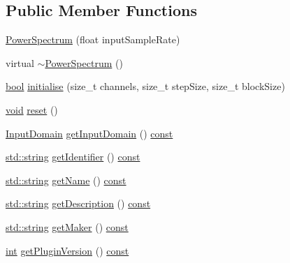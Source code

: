\subsection*{Public Member Functions}
\begin{DoxyCompactItemize}
\item 
\hyperlink{class_power_spectrum_aa2550486513a4abcf7b52869002947e7}{Power\+Spectrum} (float input\+Sample\+Rate)
\item 
virtual \hyperlink{class_power_spectrum_ae7081e159ad1da5da1721b3048075306}{$\sim$\+Power\+Spectrum} ()
\item 
\hyperlink{mac_2config_2i386_2lib-src_2libsoxr_2soxr-config_8h_abb452686968e48b67397da5f97445f5b}{bool} \hyperlink{class_power_spectrum_ae2d046334c4bede5be72a0d97e4dfb29}{initialise} (size\+\_\+t channels, size\+\_\+t step\+Size, size\+\_\+t block\+Size)
\item 
\hyperlink{sound_8c_ae35f5844602719cf66324f4de2a658b3}{void} \hyperlink{class_power_spectrum_a091ba21e1697ea4208f42e8295c389d9}{reset} ()
\item 
\hyperlink{class_vamp_1_1_plugin_a39cb7649d6dcc20e4cb1640cd55907bc}{Input\+Domain} \hyperlink{class_power_spectrum_ae04e0e34847a93f3444d04c802ee56ef}{get\+Input\+Domain} () \hyperlink{getopt1_8c_a2c212835823e3c54a8ab6d95c652660e}{const} 
\item 
\hyperlink{test__lib_f_l_a_c_2format_8c_ab02026ad0de9fb6c1b4233deb0a00c75}{std\+::string} \hyperlink{class_power_spectrum_a9e9d8349461cbb88d7565a5e8c51b64e}{get\+Identifier} () \hyperlink{getopt1_8c_a2c212835823e3c54a8ab6d95c652660e}{const} 
\item 
\hyperlink{test__lib_f_l_a_c_2format_8c_ab02026ad0de9fb6c1b4233deb0a00c75}{std\+::string} \hyperlink{class_power_spectrum_ac9214f9cafeeed3fca549c90aef57623}{get\+Name} () \hyperlink{getopt1_8c_a2c212835823e3c54a8ab6d95c652660e}{const} 
\item 
\hyperlink{test__lib_f_l_a_c_2format_8c_ab02026ad0de9fb6c1b4233deb0a00c75}{std\+::string} \hyperlink{class_power_spectrum_a7b48d56dc954f3af344f7e4dcd8993e5}{get\+Description} () \hyperlink{getopt1_8c_a2c212835823e3c54a8ab6d95c652660e}{const} 
\item 
\hyperlink{test__lib_f_l_a_c_2format_8c_ab02026ad0de9fb6c1b4233deb0a00c75}{std\+::string} \hyperlink{class_power_spectrum_a9f3e3f759e2b67c771a41f1c276984b2}{get\+Maker} () \hyperlink{getopt1_8c_a2c212835823e3c54a8ab6d95c652660e}{const} 
\item 
\hyperlink{xmltok_8h_a5a0d4a5641ce434f1d23533f2b2e6653}{int} \hyperlink{class_power_spectrum_ad23d27e4e82f10404a37b933f6a72c33}{get\+Plugin\+Version} () \hyperlink{getopt1_8c_a2c212835823e3c54a8ab6d95c652660e}{const} 

\end{DoxyCompactItemize}
